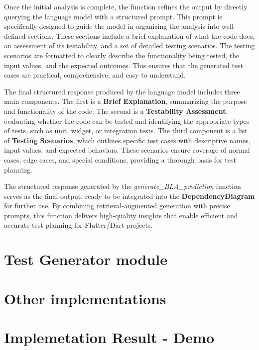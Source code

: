 Once the initial analysis is complete, the function refines the output by directly querying the language model with a structured prompt. This prompt is specifically designed to guide the model in organizing the analysis into well-defined sections. These sections include a brief explanation of what the code does, an assessment of its testability, and a set of detailed testing scenarios. The testing scenarios are formatted to clearly describe the functionality being tested, the input values, and the expected outcomes. This ensures that the generated test cases are practical, comprehensive, and easy to understand.

The final structured response produced by the language model includes three main components. The first is a \textbf{Brief Explanation}, summarizing the purpose and functionality of the code. The second is a \textbf{Testability Assessment}, evaluating whether the code can be tested and identifying the appropriate types of tests, such as unit, widget, or integration tests. The third component is a list of \textbf{Testing Scenarios}, which outlines specific test cases with descriptive names, input values, and expected behaviors. These scenarios ensure coverage of normal cases, edge cases, and special conditions, providing a thorough basis for test planning.

The structured response generated by the \textit{generate\_BLA\_prediction} function serves as the final output, ready to be integrated into the \textbf{DependencyDiagram} for further use. By combining retrieval-augmented generation with precise prompts, this function delivers high-quality insights that enable efficient and accurate test planning for Flutter/Dart projects.

\section{Test Generator module}

\section{Other implementations}

\section{Implemetation Result - Demo}